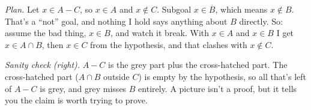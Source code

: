 \begin{center}
\begin{minipage}[c]{0.56\linewidth}
\emph{Plan.} Let $x\in A-C$, so $x\in A$ and $x\notin C$. Subgoal $x\in\overline{B}$, which means $x\notin B$. That's a ``not'' goal, and nothing I hold says anything about $B$ directly. So: assume the bad thing, $x\in B$, and watch it break. With $x\in A$ and $x\in B$ I get $x\in A\cap B$, then $x\in C$ from the hypothesis, and that clashes with $x\notin C$.\par\smallskip
\emph{Sanity check (right).} $A-C$ is the grey part plus the cross-hatched part. The cross-hatched part ($A\cap B$ outside $C$) is empty by the hypothesis, so all that's left of $A-C$ is grey, and grey misses $B$ entirely. A picture isn't a proof, but it tells you the claim is worth trying to prove.
\end{minipage}\hfill
\begin{minipage}[c]{0.4\linewidth}
\centering
{}
\end{minipage}
\end{center}

